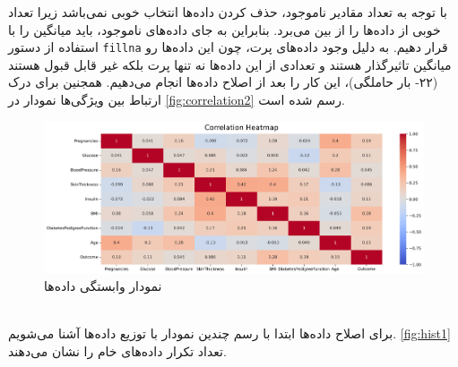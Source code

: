 \documentclass[11pt]{article}
\begin{document}
	با توجه به تعداد مقادیر ناموجود، حذف کردن داده‌ها انتخاب خوبی نمی‌باشد زیرا تعداد خوبی از داده‌ها را از بین می‌برد. بنابراین به جای داده‌های ناموجود، باید میانگین را با استفاده از دستور 
	\verb|fillna|
	قرار دهیم. به دلیل وجود داده‌های پرت، چون این داده‌ها رو میانگین تاثیر‌گذار هستند و تعدادی از این داده‌ها نه تنها پرت بلکه غیر قابل قبول هستند (۲۲- بار حاملگی)، این کار را بعد از اصلاح داده‌ها انجام می‌دهیم. همجنین برای درک ارتباط بین ویژگی‌ها نمودار 
	در
	\autoref{fig:correlation2}
	رسم شده است.\\
		\begin{figure}[!h]
		\centerline{\includegraphics[width=1\linewidth]{../HW2_2/CorrelationHeatmap.png}}
		\caption{نمودار وابستگی داده‌ها}
		\label{fig:correlation2}
	\end{figure}\\
	برای اصلاح داده‌ها ابتدا با رسم چندین نمودار با توزیع داده‌ها آشنا می‌شویم. 
	\autoref{fig:hist1}
	تعداد تکرار داده‌های خام را نشان می‌دهند.
\end{document}
